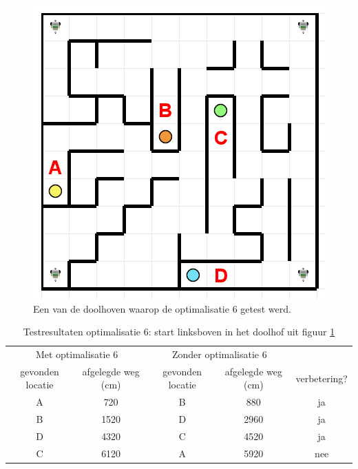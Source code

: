 \documentclass[tt3]{penoverslag}
\begin{document}
\begin{figure}[!hb]
\centering
	\includegraphics[scale=0.5]{doolhof3}
	\caption{Een van de doolhoven waarop de optimalisatie 6 getest werd.}
\label{fig:TestDead}
\end{figure}

\begin{table}[h]
\begin{center}
    \begin{tabular}{ c | c | c | c | c}
   \multicolumn{2}{c|}{Met optimalisatie 6} & \multicolumn{2}{|c|}{Zonder optimalisatie 6} & \\
     gevonden locatie & afgelegde weg (cm) & gevonden locatie &  afgelegde weg (cm) & verbetering?\\ \hline\hline
    A & 720 & B & 880 & ja \\ \hline
    B & 1520 & D & 2960 & ja \\ \hline
    D & 4320 & C & 4520 & ja\\ \hline
    C & 6120 & A & 5920 & nee\\
    \end{tabular}
    \caption{Testresultaten optimalisatie 6: start linksboven in het doolhof uit figuur \ref{fig:TestDead}}
    \label{tab:resultVerken1}
\end{center}
\end{table}
\end{document}
